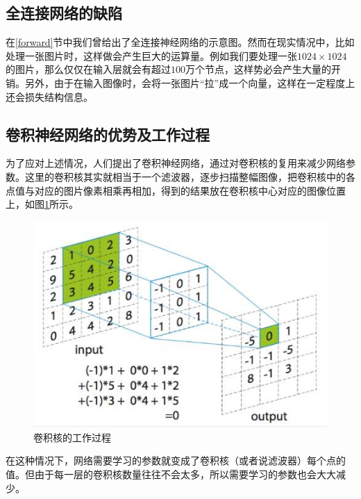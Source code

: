 \documentclass[UTF8]{ctexart}
\begin{document}
        \subsection{全连接网络的缺陷}
        
            \indent 在\ref{forward}节中我们曾给出了全连接神经网络的示意图。然而在现实情况中，比如处理一张图片时，这样做会产生巨大的运算量。例如我们要处理一张$1024\times1024$的图片，那么仅仅在输入层就会有超过$100$万个节点，这样势必会产生大量的开销。另外，由于在输入图像时，会将一张图片“拉”成一个向量，这样在一定程度上还会损失结构信息。
            
        \subsection{卷积神经网络的优势及工作过程}\label{process_of_cnn}
        
            \indent 为了应对上述情况，人们提出了卷积神经网络，通过对卷积核的复用来减少网络参数。这里的卷积核其实就相当于一个滤波器，逐步扫描整幅图像，把卷积核中的各点值与对应的图片像素相乘再相加，得到的结果放在卷积核中心对应的图像位置上，如图\ref{convolution}所示。
            
            			\begin{figure}[H]
            				\centering 
            				\includegraphics[scale=0.7]{convolution.jpg} 
            				\caption{卷积核的工作过程\protect\footnotemark[1]} 
            				\label{convolution}
            			\end{figure}
            
            \indent 在这种情况下，网络需要学习的参数就变成了卷积核（或者说滤波器）每个点的值。但由于每一层的卷积核数量往往不会太多，所以需要学习的参数也会大大减少。
            
\end{document}
